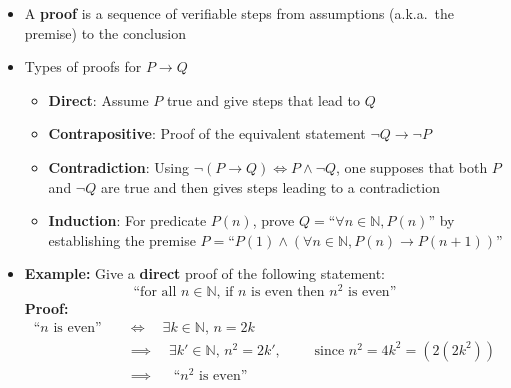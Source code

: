 \documentclass[11pt,twoside]{report}
\begin{document}
\begin{itemize}
\item A \textbf{proof} is a sequence of verifiable steps from assumptions (a.k.a.\ the premise)  to the conclusion

\item Types of proofs for $P \to Q$
\begin{itemize} 
 \item  \textbf{Direct}: Assume $P$ true and give steps that lead to $Q$
 \item   \textbf{Contrapositive}: Proof of the equivalent statement $\neg Q \rightarrow \neg P$
 \item  \textbf{Contradiction}: Using $\neg (P \rightarrow Q) \iff P \wedge \neg Q$, one supposes that both $P$ and $\neg Q$ are true and then gives steps leading to a contradiction
 \item   \textbf{Induction}: For predicate $P(n)$, prove $Q=$``$\forall n\in\mathbb{N}, P(n)$'' by establishing the premise $P=$``$P(1) \wedge (\forall n\in \mathbb{N}, P(n) \rightarrow P(n\!+\!1))$''
\end{itemize}

\item \textbf{Example:} Give a \textbf{direct} proof of the following statement: 
\[
\text{``for all $n \in \mathbb{N}$, if $n$ is even then $n^2$ is even''} 
\]
\textbf{Proof:} 
\begin{align*}
\text{``$n$ is even''}   \quad &\iff \quad \exists k \in \mathbb{N}, \, n = 2k\\
&\implies \quad \exists k' \in \mathbb{N}, \, n^2 = 2k', \qquad \text{ since $n^2 =4 k^2  = (2 ( 2k^2))$}\\
& \implies \quad \text{ ``$n^2$ is even''}
\end{align*}



\end{itemize}
\end{document}
